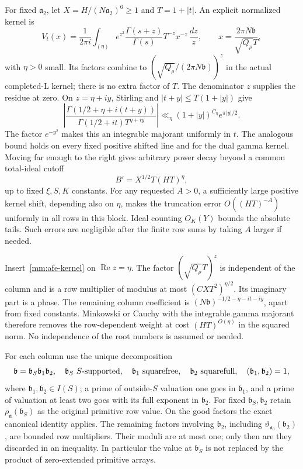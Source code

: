 For fixed $\mathfrak a_2$, let $X=H/(N\mathfrak a_2)^6\ge1$ and
$T=1+|t|$. An explicit normalized kernel is
\begin{equation}\label{mm:afe-kernel}
 V_t(x)=\frac1{2\pi i}\int_{(\eta)}
 e^{z^2}\frac{\Gamma(s+z)}{\Gamma(s)}T^{-z}x^{-z}\,\frac{dz}{z},
 \qquad x=\frac{2\pi N\mathfrak b}{\sqrt{Q_\rho}T},
\end{equation}
with $\eta>0$ small. Its factors combine to
$(\sqrt{Q_\rho}/(2\pi N\mathfrak b))^z$ in the actual completed-L
kernel; there is no extra factor of $T$. The denominator $z$ supplies
the residue at zero.
On $z=\eta+iy$, Stirling and $|t+y|\le T(1+|y|)$ give
\[
 \left|\frac{\Gamma(1/2+\eta+i(t+y))}
                 {\Gamma(1/2+it)T^{\eta+iy}}\right|
 \ll_\eta (1+|y|)^{C_\eta}e^{\pi|y|/2}.
\]
The factor $e^{-y^2}$ makes this an integrable majorant uniformly in
$t$. The analogous bound holds on every fixed positive shifted line
and for the dual gamma kernel. Moving far enough to the right gives
arbitrary power decay beyond a common total-ideal cutoff
\begin{equation}\label{mm:common-cutoff}
 B'=X^{1/2}T(HT)^\eta,
\end{equation}
up to fixed $\xi,S,K$ constants. For any requested $A>0$, a sufficiently
large positive kernel shift, depending also on $\eta$, makes the
truncation error $O((HT)^{-A})$ uniformly in all rows in this block.
Ideal counting $O_K(Y)$ bounds the absolute tails. Such errors are
negligible after the finite row sums by taking $A$ larger if needed.

Insert~\eqref{mm:afe-kernel} on $\operatorname{Re}z=\eta$.
The factor $(\sqrt{Q_\rho}T)^z$ is independent of the column and is a
row multiplier of modulus at most $(CXT^2)^{\eta/2}$.
Its imaginary part is a phase. The remaining column coefficient is
$(N\mathfrak b)^{-1/2-\eta-it-iy}$, apart from fixed constants.
Minkowski or Cauchy with the integrable gamma majorant therefore removes
the row-dependent weight at cost $(HT)^{O(\eta)}$ in the squared norm.
No independence of the root numbers is assumed or needed.

For each column use the unique decomposition
\[
 \mathfrak b=\mathfrak b_S\mathfrak b_1\mathfrak b_2,
 \quad \mathfrak b_S\ S\hbox{-supported},\quad
 \mathfrak b_1\ \hbox{squarefree},\quad
 \mathfrak b_2\ \hbox{squarefull},\quad
 (\mathfrak b_1,\mathfrak b_2)=1,
\]
where $\mathfrak b_1,\mathfrak b_2\in I(S)$; a prime of outside-$S$
valuation one goes in $\mathfrak b_1$, and a prime of valuation at least
two goes with its full exponent in $\mathfrak b_2$. For fixed
$\mathfrak b_S,\mathfrak b_2$ retain
$\rho_{\mathfrak a}(\mathfrak b_S)$ as the original primitive row
value. On the good factors the exact canonical identity applies.
The remaining factors involving $\mathfrak b_2$, including
$\vartheta_{\mathfrak a_0}(\mathfrak b_2)$, are bounded row
multipliers. Their moduli are at most one; only then are they discarded
in an inequality. In particular the value at $\mathfrak b_S$ is not
replaced by the product of zero-extended primitive arrays.

